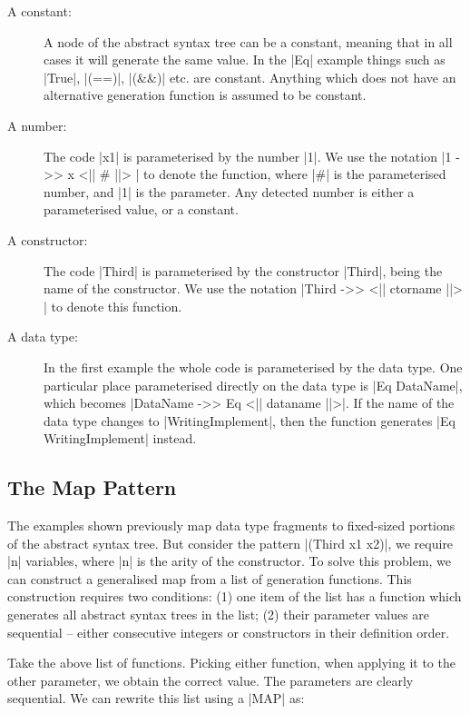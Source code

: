 \documentclass{llncs}
\begin{document}
\begin{description}
\item[A constant:] A node of the abstract syntax tree can be a constant, meaning that in all cases it will generate the same value. In the |Eq| example things such as |True|, |(==)|, |(&&)| etc. are constant. Anything which does not have an alternative generation function is assumed to be constant.

\item[A number:] The code |x1| is parameterised by the number |1|. We use the notation |1 ->> x <|| # ||> | to denote the function, where |#| is the parameterised number, and |1| is the parameter. Any detected number is either a parameterised value, or a constant.

\item[A constructor:] The code |Third| is parameterised by the constructor |Third|, being the name of the constructor. We use the notation |Third ->> <|| ctorname ||> | to denote this function.

\item[A data type:] In the first example the whole code is parameterised by the data type. One particular place parameterised directly on the data type is |Eq DataName|, which becomes |DataName ->> Eq \? <|| dataname ||>|. If the name of the data type changes to |WritingImplement|, then the function generates |Eq WritingImplement| instead.
\end{description}

\subsection{The Map Pattern}
\label{sec:induction}

The examples shown previously map data type fragments to fixed-sized portions of the abstract syntax tree. But consider the pattern |(Third x1 x2)|, we require |n| variables, where |n| is the arity of the constructor. To solve this problem, we can construct a generalised map from a list of generation functions. This construction requires two conditions: (1) one item of the list has a function which generates all abstract syntax trees in the list; (2) their parameter values are sequential -- either consecutive integers or constructors in their definition order.

\begin{code}
[1 ->> x <| # |>, 2 ->> x <| # |>]
\end{code}

Take the above list of functions. Picking either function, when applying it to the other parameter, we obtain the correct value. The parameters are clearly sequential. We can rewrite this list using a |MAP| as:
\end{document}
